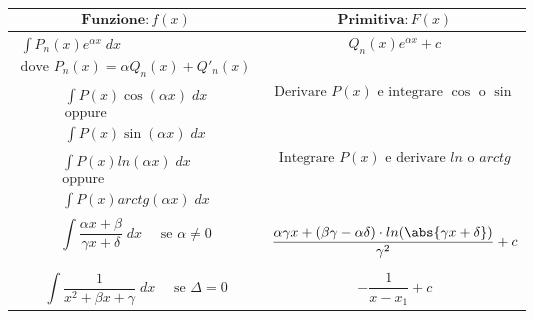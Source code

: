 \documentclass[a4paper, 12pt]{report}
\begin{document}
        \begin{tabular}{m{} | m{}}
        $$\textbf{Funzione}: f(x)$$ & $$\textbf{Primitiva}: F(x)$$\\
        \hline
        
        $$
        \begin{array}{c}
            \int P_n(x) e^{\alpha x} \; dx \\
            \text{dove } P_n(x) = \alpha Q_n(x) + Q'_n(x)
        \end{array}
        $$ &
        
        $$
        \begin{array}{c}
            Q_n(x) e^{\alpha x}+c
        \end{array}
        $$\\
        
        $$
        \begin{array}{c}
            \int P(x) \cos(\alpha x) \; dx\\
            \text{oppure} \\
            \int P(x) \sin(\alpha x) \; dx
        \end{array}
        $$ &
        
        \[ \text{Derivare } P(x) \text{ e integrare $\cos$ o $\sin$} \] \\
        
        $$
        \begin{array}{c}
            \int P(x) ln(\alpha x)\; dx \\
            \text{oppure} \\
            \int P(x) arctg(\alpha x)\; dx
        \end{array}
        $$ &
        
        \[ \text{Integrare } P(x) \text{ e derivare $ln$ o $arctg$} \]
        \\
        
            \[ \int  \frac{\alpha x + \beta}{\gamma x + \delta}\; dx \quad \text{ se } \alpha \neq 0\]
            & \[\frac{\alpha \gamma x + (\beta \gamma - \alpha \delta) \cdot ln(\abs{\gamma x + \delta})}{\gamma^2}+c\]
            
            \\
            
        \[ \int \frac{1}{x^2 + \beta x + \gamma}\; dx
        \quad \text{ se } \Delta = 0\] &
        \[ -\frac{1}{x-x_1}+c\]
        \\
        

\end{tabular}
\end{document}

